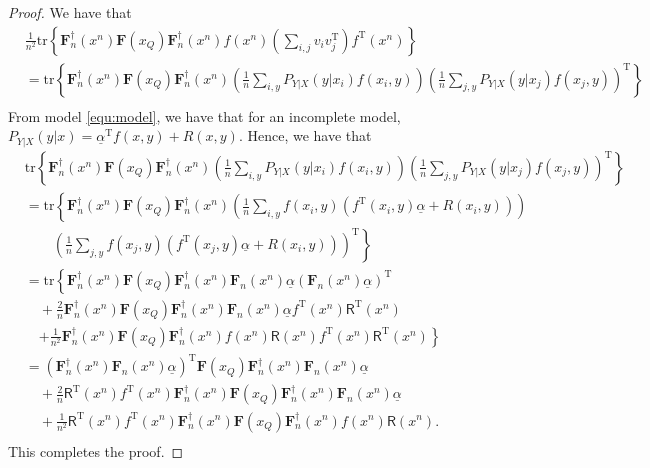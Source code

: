 \documentclass{article} %
\theoremstyle{plain} %
\begin{document}
\begin{proof}
We have that
\begin{align*}
& \frac1{n^2}\mathrm{tr}\left\{ \mathbf{F}_n^{\dagger}(x^n)\mathbf{F}(x_Q)\mathbf{F}_n^{\dagger}(x^n) f(x^n)\left(\sum_{i,j}v_iv_j^\mathrm{T}\right) f^\mathrm{T}(x^n)\right\}\\
& = \mathrm{tr}\left\{ \mathbf{F}_n^{\dagger}(x^n)\mathbf{F}(x_Q)\mathbf{F}_n^{\dagger}(x^n)\left(\frac1n\sum_{i,y}P_{Y|X}(y|x_i) f(x_i, y)\right)\left(\frac1n\sum_{j,y} P_{Y|X}(y|x_j) f(x_j,y)\right)^\mathrm{T}\right\}\\
\end{align*}
From model \ref{equ:model}, we have that for an incomplete model, $P_{Y|X}(y|x) = \underline{\alpha}^\mathrm{T}f(x,y) + R(x,y)$. Hence, we have that
\begin{align*}
& \mathrm{tr}\left\{ \mathbf{F}_n^{\dagger}(x^n)\mathbf{F}(x_Q)\mathbf{F}_n^{\dagger}(x^n)\left(\frac1n\sum_{i,y}P_{Y|X}(y|x_i) f(x_i, y)\right)\left(\frac1n\sum_{j,y} P_{Y|X}(y|x_j) f(x_j,y)\right)^\mathrm{T}\right\}\\
& = \mathrm{tr}\left\{\mathbf{F}_n^{\dagger}(x^n) \mathbf{F}(x_Q)\mathbf{F}_n^{\dagger}(x^n)\left(\frac1n\sum_{i,y} f(x_i, y)(f^\mathrm{T}(x_i, y) \underline{\alpha}+R(x_i,y)) \right)\right.\\
&\quad \quad\left.\left(\frac1n\sum_{j,y} f(x_j,y)(f^\mathrm{T}(x_j,y)\underline{\alpha}+R(x_i,y))\right)^\mathrm{T}\right\}\\
& = \mathrm{tr}\left\{\mathbf{F}_n^{\dagger}(x^n) \mathbf{F}(x_Q)\mathbf{F}_n^{\dagger}(x^n)\mathbf{F}_n(x^n) \underline{\alpha} \left(\mathbf{F}_n(x^n)\underline{\alpha}\right)^\mathrm{T}\right.\\
&\quad + \frac2n \mathbf{F}_n^{\dagger}(x^n) \mathbf{F}(x_Q)\mathbf{F}_n^{\dagger}(x^n) \mathbf{F}_n(x^n)\underline{\alpha} f^\mathrm{T}(x^n)\mathsf{R}^\mathrm{T}(x^n)\\
& \quad \left.+ \frac1{n^2} \mathbf{F}_n^{\dagger}(x^n) \mathbf{F}(x_Q)\mathbf{F}_n^{\dagger}(x^n) f(x^n) \mathsf{R}(x^n)f^\mathrm{T}(x^n)\mathsf{R}^\mathrm{T}(x^n)\right\}\\
& = \left(\mathbf{F}_n^{\dagger}(x^n)\mathbf{F}_n(x^n)\underline{\alpha}\right)^\mathrm{T}\mathbf{F}(x_Q) \mathbf{F}_n^{\dagger}(x^n)\mathbf{F}_n(x^n)\underline{\alpha}\\
& \quad + \frac2n \mathsf{R}^\mathrm{T}(x^n)f^\mathrm{T}(x^n)\mathbf{F}_n^{\dagger}(x^n) \mathbf{F}(x_Q)\mathbf{F}_n^{\dagger}(x^n) \mathbf{F}_n(x^n)\underline{\alpha}\\
&\quad + \frac1{n^2}  \mathsf{R}^\mathrm{T}(x^n)f^\mathrm{T}(x^n)\mathbf{F}_n^{\dagger}(x^n) \mathbf{F}(x_Q)\mathbf{F}_n^{\dagger}(x^n) f(x^n) \mathsf{R}(x^n).\\
\end{align*}
This completes the proof.
\end{proof}
\end{document}
